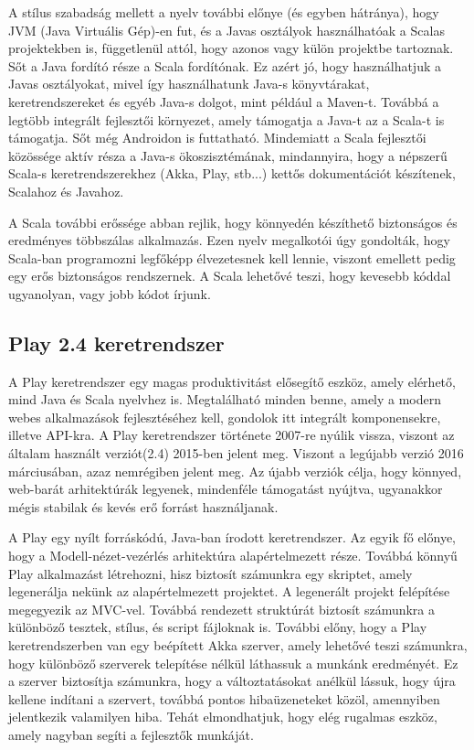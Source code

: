 A stílus szabadság mellett a nyelv további előnye (és egyben hátránya), hogy JVM (Java Virtuális Gép)-en fut, és a Javas osztályok használhatóak a Scalas projektekben is, függetlenül attól, hogy azonos vagy külön projektbe tartoznak. Sőt a Java fordító része a Scala fordítónak. Ez azért jó, hogy használhatjuk a Javas osztályokat, mivel így használhatunk Java-s könyvtárakat, keretrendszereket és egyéb Java-s dolgot, mint például a Maven-t. Továbbá a legtöbb integrált fejlesztői környezet, amely támogatja a Java-t az a Scala-t is támogatja. Sőt még Androidon is futtatható. Mindemiatt a Scala fejlesztői közössége aktív résza a Java-s ökoszisztémának, mindannyira, hogy a népszerű Scala-s keretrendszerekhez (Akka, Play, stb...) kettős dokumentációt készítenek, Scalahoz és Javahoz.

A Scala további erőssége abban rejlik, hogy könnyedén készíthető biztonságos és eredményes többszálas alkalmazás.
Ezen nyelv megalkotói úgy gondolták, hogy Scala-ban programozni legfőképp élvezetesnek kell lennie, viszont emellett pedig egy erős biztonságos rendszernek. A Scala lehetővé teszi, hogy kevesebb kóddal ugyanolyan, vagy jobb kódot írjunk.

\subsection{Play 2.4 keretrendszer}
A Play keretrendszer egy magas produktivitást elősegítő eszköz, amely elérhető, mind Java és Scala nyelvhez is. Megtalálható minden benne, amely a modern webes alkalmazások fejlesztéséhez kell, gondolok itt integrált komponensekre, illetve API-kra. A Play keretrendszer története 2007-re nyúlik vissza, viszont az általam használt verziót(2.4) 2015-ben jelent meg. Viszont a legújabb verzió 2016 márciusában, azaz nemrégiben jelent meg. Az újabb verziók célja, hogy könnyed, web-barát arhitektúrák legyenek, mindenféle támogatást nyújtva, ugyanakkor mégis stabilak és kevés erő forrást használjanak.

A Play egy nyílt forráskódú, Java-ban írodott keretrendszer. Az egyik fő előnye, hogy a Modell-nézet-vezérlés arhitektúra alapértelmezett része. Továbbá könnyű Play alkalmazást létrehozni, hisz biztosít számunkra egy skriptet, amely legenerálja nekünk az alapértelmezett projektet. A legenerált projekt felépítése megegyezik az MVC-vel. Továbbá rendezett struktúrát biztosít számunkra a különböző tesztek, stílus, és script fájloknak is. További előny, hogy a Play keretrendszerben van egy beépített Akka szerver, amely lehetővé teszi számunkra, hogy különböző szerverek telepítése nélkül láthassuk a munkánk eredményét. Ez a szerver biztosítja számunkra, hogy a változtatásokat anélkül lássuk, hogy újra kellene indítani a szervert, továbbá pontos hibaüzeneteket közöl, amennyiben jelentkezik valamilyen hiba. Tehát elmondhatjuk, hogy elég rugalmas eszköz, amely nagyban segíti a fejlesztők munkáját. 

